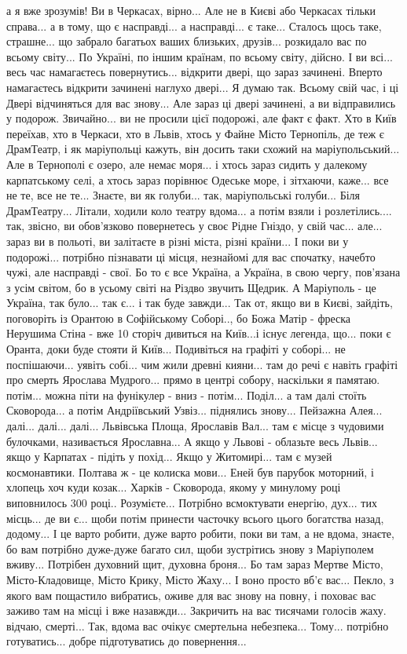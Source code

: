 а я вже зрозумів! Ви в Черкасах, вірно... Але не в Києві або Черкасах тільки
справа... а в тому, що є насправді... а насправді... є таке... Сталось щось
таке, страшне... що забрало багатьох ваших близьких, друзів... розкидало вас по
всьому світу... По Україні, по іншим країнам, по всьому світу, дійсно. І ви
всі... весь час намагаєтесь повернутись... відкрити двері, що зараз зачинені.
Вперто намагаєтесь відкрити зачинені наглухо двері... Я думаю так. Всьому свій
час, і ці Двері відчиняться для вас знову... Але зараз ці двері зачинені, а ви
відправились у подорож. Звичайно... ви не просили цієї подорожі, але факт є
факт. Хто в Київ переїхав, хто в Черкаси, хто в Львів, хтось у Файне Місто
Тернопіль, де теж є ДрамТеатр, і як маріупольці кажуть, він досить таки схожий
на маріупольський... Але в Тернополі є озеро, але немає моря... і хтось зараз
сидить у далекому карпатському селі, а хтось зараз порівнює Одеське море, і
зітхаючи, каже... все не те, все не те... Знаєте, ви як голуби... так,
маріупольські голуби... Біля ДрамТеатру... Літали, ходили коло театру вдома...
а потім взяли і розлетілись.... так, звісно, ви обов'язково повернетесь у своє
Рідне Гніздо, у свій час... але... зараз ви в польоті, ви залітаєте в різні
міста, різні країни... І поки ви у подорожі... потрібно пізнавати ці місця,
незнайомі для вас спочатку, начебто чужі, але насправді - свої. Бо то є все
Україна, а Україна, в свою чергу, пов'язана з усім світом, бо в усьому світі на
Різдво звучить Щедрик. А Маріуполь - це Україна, так було... так є... і так
буде завжди... Так от, якщо ви в Києві, зайдіть, поговоріть із Орантою в
Софійському Соборі.., бо Божа Матір - фреска Нерушима Стіна - вже 10 сторіч
дивиться на Київ...і існує легенда, що... поки є Оранта, доки буде стояти й
Київ... Подивіться на графіті у соборі... не поспішаючи... уявіть собі... чим
жили древні кияни... там до речі є навіть графіті про смерть Ярослава
Мудрого... прямо в центрі собору, наскільки я памятаю. потім... можна піти на
фунікулер - вниз - потім... Поділ... а там далі стоїть Сковорода... а потім
Андріївський Узвіз... піднялись знову... Пейзажна Алея... далі... далі...
далі... Львівська Площа, Ярославів Вал... там є місце з чудовими булочками,
називається Ярославна... А якщо у Львові - облазьте весь Львів... якщо у
Карпатах - підіть у похід... Якщо у Житомирі... там є музей космонавтики.
Полтава ж - це колиска мови... Еней був парубок моторний, і хлопець хоч куди
козак... Харків - Сковорода, якому у минулому році виповнилось 300 році..
Розумієте... Потрібно всмоктувати енергію, дух... тих місць... де ви є... щоби
потім принести часточку всього цього богатства назад, додому... І це варто
робити, дуже варто робити, поки ви там, а не вдома, знаєте, бо вам потрібно
дуже-дуже багато сил, щоби зустрітись знову з Маріуполем вживу... Потрібен
духовний щит, духовна броня...   Бо там зараз Мертве Місто, Місто-Кладовище,
Місто Крику, Місто Жаху... І воно просто вб'є вас... Пекло, з якого вам
пощастило вибратись, оживе для вас знову на повну, і поховає вас заживо там на
місці і вже назавжди... Закричить на вас тисячами голосів жаху. відчаю,
смерті... Так, вдома вас очікує смертельна небезпека... Тому... потрібно
готуватись... добре підготуватись до повернення...  

